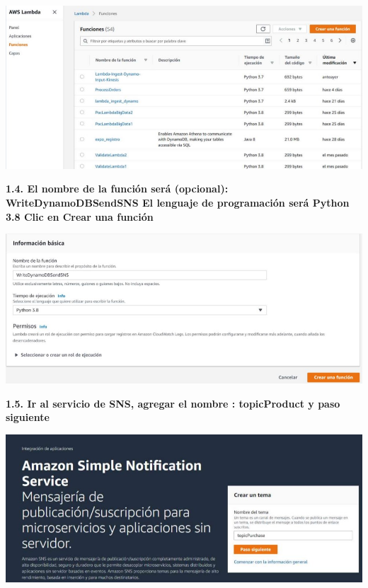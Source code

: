 \documentclass{article}
\begin{document}
    \begin{center}
		\includegraphics[width=15cm]{./images/2} 
	\end{center}

\newpage
\textbf{1.4.  El nombre de la función será (opcional): WriteDynamoDBSendSNS
El lenguaje de programación será Python 3.8
Clic en Crear una función
}

    \begin{center}
		\includegraphics[width=15cm]{./images/3} 
	\end{center}
	
	\newpage
\textbf{1.5.   Ir al servicio de SNS, agregar el nombre : topicProduct y paso siguiente
}

    \begin{center}
		\includegraphics[width=15cm]{./images/4} 
	\end{center}
	
\end{document}
